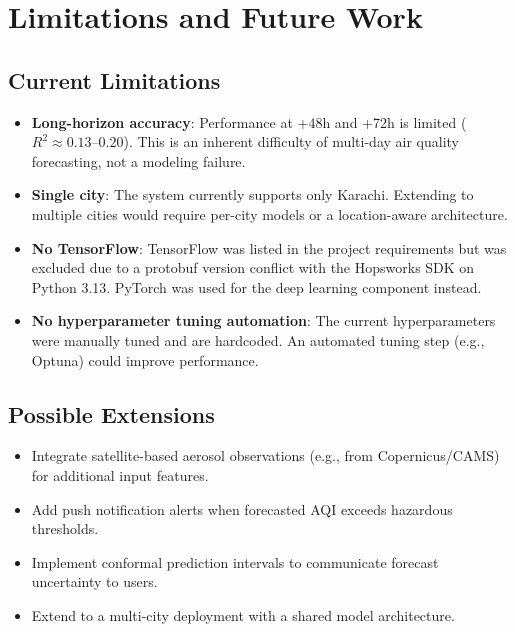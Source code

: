 \documentclass[12pt, a4paper]{article}
\begin{document}
\section{Limitations and Future Work}

\subsection{Current Limitations}

\begin{itemize}
  \item \textbf{Long-horizon accuracy}: Performance at +48h and +72h is limited ($R^2 \approx 0.13$--$0.20$).  This is an inherent difficulty of multi-day air quality forecasting, not a modeling failure.
  \item \textbf{Single city}: The system currently supports only Karachi.  Extending to multiple cities would require per-city models or a location-aware architecture.
  \item \textbf{No TensorFlow}: TensorFlow was listed in the project requirements but was excluded due to a protobuf version conflict with the Hopsworks SDK on Python 3.13.  PyTorch was used for the deep learning component instead.
  \item \textbf{No hyperparameter tuning automation}: The current hyperparameters were manually tuned and are hardcoded.  An automated tuning step (e.g., Optuna) could improve performance.
\end{itemize}

\subsection{Possible Extensions}

\begin{itemize}
  \item Integrate satellite-based aerosol observations (e.g., from Copernicus/CAMS) for additional input features.
  \item Add push notification alerts when forecasted AQI exceeds hazardous thresholds.
  \item Implement conformal prediction intervals to communicate forecast uncertainty to users.
  \item Extend to a multi-city deployment with a shared model architecture.
\end{itemize}


\end{document}
